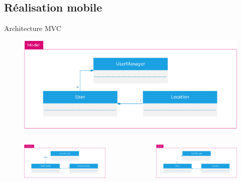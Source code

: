 \documentclass{beamer} %
\begin{document}
  \subsection{Réalisation mobile}
  \begin{frame}{\subsecname}
      \begin{center}
        Architecture MVC
        \begin{figure}
        \includegraphics[width=0.58\linewidth, height=\textheight, keepaspectratio]{android-model.png}
        \end{figure}
      \end{center}

      \vspace*{-8mm}

      \begin{columns}
        \begin{column}{0.58\textwidth}
          \begin{figure}
          \includegraphics[width=\linewidth, height=\textheight, keepaspectratio]{android-controller.png}
          \end{figure}
        \end{column}
        \begin{column}{0.58\textwidth}
          \begin{figure}
          \includegraphics[width=\linewidth, height=\textheight, keepaspectratio]{android-model.png}
          \end{figure}
        \end{column}
      \end{columns}

  \end{frame}
\end{document}
